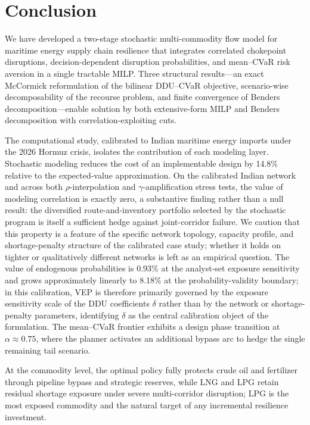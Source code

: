\documentclass[final,3p,authoryear]{elsarticle}
\theoremstyle{definition}
\begin{document}
\section{Conclusion}
\label{sec:conclusion}

We have developed a two-stage stochastic multi-commodity flow model
for maritime energy supply chain resilience that integrates correlated
chokepoint disruptions, decision-dependent disruption probabilities,
and mean--CVaR risk aversion in a single tractable MILP. Three
structural results---an exact McCormick reformulation of the bilinear
DDU--CVaR objective, scenario-wise decomposability of the recourse
problem, and finite convergence of Benders decomposition---enable
solution by both extensive-form MILP and Benders decomposition with
correlation-exploiting cuts.

The computational study, calibrated to Indian maritime energy imports
under the 2026 Hormuz crisis, isolates the contribution of each
modeling layer. Stochastic modeling reduces the cost of an
implementable design by 14.8\% relative to the expected-value
approximation. On the calibrated Indian network and across both
$\rho$-interpolation and $\gamma$-amplification stress tests, the
value of modeling correlation is exactly zero, a substantive finding
rather than a null result: the diversified route-and-inventory
portfolio selected by the stochastic program is itself a sufficient
hedge against joint-corridor failure. We caution that this property
is a feature of the specific network topology, capacity profile, and
shortage-penalty structure of the calibrated case study; whether it
holds on tighter or qualitatively different networks is left as an
empirical question. The value of endogenous probabilities is 0.93\%
at the analyst-set exposure sensitivity and grows approximately
linearly to 8.18\% at the probability-validity boundary; in this
calibration, VEP is therefore primarily governed by the exposure
sensitivity scale of the DDU coefficients $\delta$ rather than by
the network or shortage-penalty parameters, identifying $\delta$ as the
central calibration object of the formulation. The mean--CVaR
frontier exhibits a design phase transition at $\alpha\approx 0.75$,
where the planner activates an additional bypass arc to hedge the
single remaining tail scenario.

At the commodity level, the optimal policy fully protects crude oil
and fertilizer through pipeline bypass and strategic reserves, while
LNG and LPG retain residual shortage exposure under severe
multi-corridor disruption; LPG is the most exposed commodity and the
natural target of any incremental resilience investment.
\end{document}
